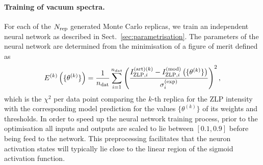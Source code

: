 \paragraph{Training of vacuum spectra.}
%
For each of the $N_{\rm rep}$ generated Monte Carlo replicas, we train an independent
neural network as described in Sect.~\ref{sec:parametrisation}.
%
The parameters of the neural network are determined from the minimisation of a figure of merit
defined as
\begin{equation}
  \label{eq:chi2}
\begin{centering}
  E^{(k)}\lp \{\theta^{(k)}\}\rp = \frac{1}{n_{\rm dat}}\sum_{i=1}^{n_{dat}}\left(\frac{ I_{{\rm ZLP},i}^{{\rm (art)}(k)} -
  I_{{\rm ZLP},i}^{{\rm (mod)}}\lp \{\theta^{(k)}\}\rp }{\sigma_i^{(\rm exp)}}\right)^2, 
\end{centering}
\end{equation}
which is the $\chi^2$ per data point comparing the $k$-th replica for the ZLP
intensity with the corresponding model prediction for the values
$\{\theta^{(k)}\}$ of its weights and thresholds.
%
In order to speed up the neural network training process, prior to the optimisation
all inputs and outputs are scaled to lie between $[0.1, 0.9]$ before
being feed to the network.
%
This preprocessing facilitates that
 the neuron activation states will typically
lie close to the linear region of the sigmoid activation function.

